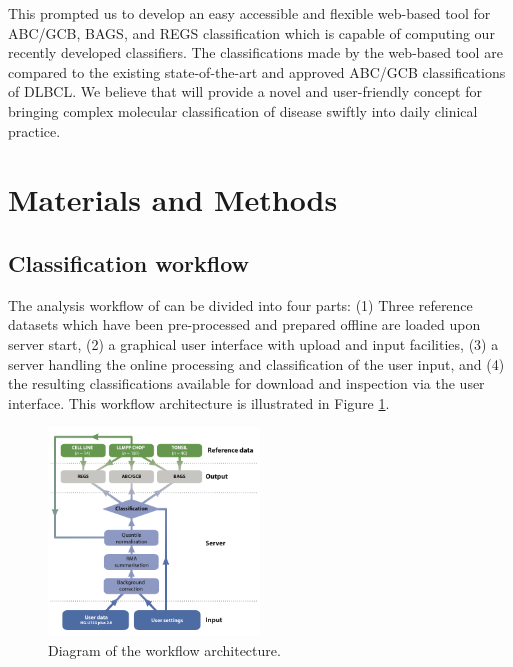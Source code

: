 \documentclass{article}
\begin{document}
This prompted us to develop an easy accessible and flexible web-based tool for ABC/GCB, BAGS, and REGS classification which is capable of computing our recently developed classifiers.
The classifications made by the web-based tool \hemaClass{} are compared to the existing state-of-the-art and approved ABC/GCB classifications of DLBCL.
We believe that \hemaClass{} will provide a novel and user-friendly concept for bringing complex molecular classification of disease swiftly into daily clinical practice.


\section{Materials and Methods}

\subsection{Classification workflow}
The analysis workflow of \hemaClass{} can be divided into four parts:
(1) Three reference datasets which have been pre-processed and prepared offline are loaded upon server start,
(2) a graphical user interface with upload and input facilities,
(3) a server handling the online processing and classification of the user input, and
(4) the resulting classifications available for download and inspection via the user interface.
This workflow architecture is illustrated in Figure \ref{fig:webtooldiagram}.

\begin{figure}
\begin{center}
\includegraphics[width=0.5\textwidth]{figures/Flowchart6.pdf}
\end{center}
\caption{Diagram of the workflow architecture.}
\label{fig:webtooldiagram}
\end{figure}
\end{document}
